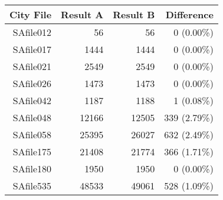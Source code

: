 \begin{tabular}{| r | r  r  r |}
\hline
\textbf{City File} & \textbf{Result A} & \textbf{Result B} & \textbf{Difference} \\
\hline
\hline
SAfile012 & 56 & 56 & 0 (0.00\%) \\
SAfile017 & 1444 & 1444 & 0 (0.00\%) \\
SAfile021 & 2549 & 2549 & 0 (0.00\%) \\
SAfile026 & 1473 & 1473 & 0 (0.00\%) \\
SAfile042 & 1187 & 1188 & 1 (0.08\%) \\
SAfile048 & 12166 & 12505 & 339 (2.79\%) \\
SAfile058 & 25395 & 26027 & 632 (2.49\%) \\
SAfile175 & 21408 & 21774 & 366 (1.71\%) \\
SAfile180 & 1950 & 1950 & 0 (0.00\%) \\
SAfile535 & 48533 & 49061 & 528 (1.09\%) \\
\hline
\end{tabular}
